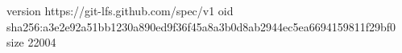 version https://git-lfs.github.com/spec/v1
oid sha256:a3e2e92a51bb1230a890ed9f36f45a8a3b0d8ab2944ec5ea6694159811f29bf0
size 22004
